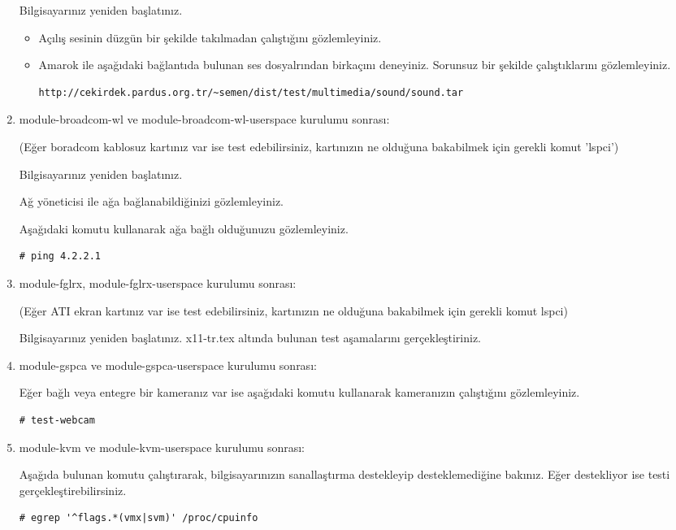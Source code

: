 \documentclass[a4paper,10pt]{article}
\begin{document}
\begin{enumerate}
Bilgisayarınız yeniden başlatınız.
\begin{itemize}
\item Açılış sesinin düzgün bir şekilde takılmadan çalıştığını gözlemleyiniz.

\item Amarok ile aşağıdaki bağlantıda bulunan ses dosyalrından birkaçını deneyiniz. Sorunsuz bir şekilde çalıştıklarını gözlemleyiniz.
\begin{verbatim}
http://cekirdek.pardus.org.tr/~semen/dist/test/multimedia/sound/sound.tar 
\end{verbatim}

\end{itemize}

\item module-broadcom-wl ve module-broadcom-wl-userspace kurulumu sonrası: 

(Eğer boradcom kablosuz kartınız var ise test edebilirsiniz, kartınızın ne olduğuna bakabilmek için gerekli komut 'lspci')

Bilgisayarınız yeniden başlatınız.

Ağ yöneticisi ile ağa bağlanabildiğinizi gözlemleyiniz.

Aşağıdaki komutu kullanarak ağa bağlı olduğunuzu gözlemleyiniz.
\begin{verbatim}
# ping 4.2.2.1 
\end{verbatim}

\item module-fglrx, module-fglrx-userspace  kurulumu sonrası: 

(Eğer ATI ekran kartınız var ise test edebilirsiniz, kartınızın ne olduğuna bakabilmek için gerekli komut lspci)

Bilgisayarınız yeniden başlatınız. x11-tr.tex altında bulunan test aşamalarını gerçekleştiriniz.

\item module-gspca ve module-gspca-userspace kurulumu sonrası:

Eğer bağlı veya entegre bir kameranız var ise aşağıdaki komutu kullanarak kameranızın çalıştığını gözlemleyiniz.
\begin{verbatim}
# test-webcam
\end{verbatim}

\item module-kvm ve module-kvm-userspace kurulumu sonrası:

Aşağıda bulunan komutu çalıştırarak, bilgisayarınızın sanallaştırma destekleyip desteklemediğine bakınız. Eğer destekliyor ise testi gerçekleştirebilirsiniz. 
\begin{verbatim}
# egrep '^flags.*(vmx|svm)' /proc/cpuinfo
\end{verbatim}


\end{enumerate}
\end{document}
